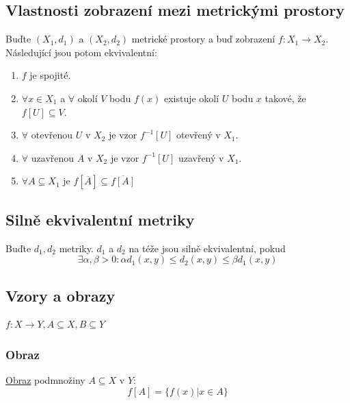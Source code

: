 \documentclass[../main.tex]{subfiles}
\begin{document}
\subsection{Vlastnosti zobrazení mezi metrickými prostory}
\hspace{1.2mm}
\noindent
Buďte $(X_1, d_1)$ a $(X_2, d_2)$ metrické prostory a buď zobrazení $f: X_1 \to X_2$. Následující
jsou potom ekvivalentní:
\begin{enumerate}
    \item $f$ je spojité.
    \item $\forall x \in X_1$ a $\forall$ okolí $V$ bodu $f(x)$ existuje okolí $U$ bodu $x$ takové, že
        $f[U] \subseteq V$.
    \item $\forall$ otevřenou $U$ v $X_2$ je vzor $f^{-1}[U]$ otevřený v $X_1$.
    \item $\forall$ uzavřenou $A$ v $X_2$ je vzor $f^{-1}[U]$ uzavřený v $X_1$.
    \item $\forall A \subseteq X_1$ je $f[\overline{A}] \subseteq \overline{f[A]}$
\end{enumerate}


\subsection{Silně ekvivalentní metriky}
\hspace{1.2mm}
\noindent
Buďte $d_1, d_2$ metriky. $d_1$ a $d_2$ na téže jsou silně ekvivalentní, pokud
\[\exists \alpha , \beta > 0: \alpha d_1(x,y) \leq d_2(x,y) \leq \beta d_1(x,y)\]

\subsection{Vzory a obrazy}
\hspace{1.2mm}
$f: X \rightarrow Y, A \subseteq X, B \subseteq Y$
\noindent
\subsubsection{Obraz}
\hspace{1.2mm}
\underline{Obraz} podmnožiny $A\subseteq X$ v $Y$:
\[f[A] = \{f(x) | x \in A\}\]
\noindent
\end{document}
